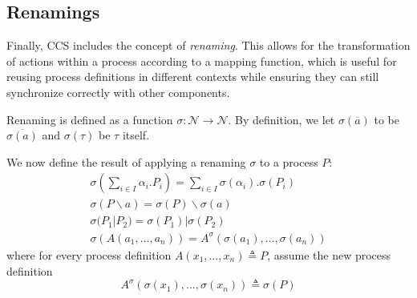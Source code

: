 \subsection{Renamings}
Finally, CCS includes the concept of \textit{renaming}. This allows for the transformation of actions within a process according to a mapping function, which is useful for reusing process definitions in different contexts while ensuring they can still synchronize correctly with other components.

Renaming is defined as a function $\sigma:\mathcal{N}\to\mathcal{N}$. By definition, we let $\sigma(\overline{a})$ to be $\overline{\sigma(a)}$ and $\sigma(\tau)$ be $\tau$ itself.

We now define the result of applying a renaming $\sigma$ to a process $P$:
\begin{gather*}
    \sigma(\sum_{i\in I}\alpha_i.P_i) = \sum_{i\in I}\sigma(\alpha_i).\sigma(P_i)\\
    \sigma(P\backslash a) = \sigma(P)\backslash \sigma(a)\\
    \sigma(P_1|P_2) = \sigma(P_1)|\sigma(P_2)\\
    \sigma(A(a_1,\ldots ,a_n)) = A^\sigma(\sigma(a_1),\ldots ,\sigma(a_n))
\end{gather*}
where for every process definition $A(x_1,\ldots ,x_n)\triangleq P$, assume the new process definition
\begin{equation*}
    A^\sigma(\sigma(x_1),\ldots ,\sigma(x_n))\triangleq \sigma(P)
\end{equation*}

